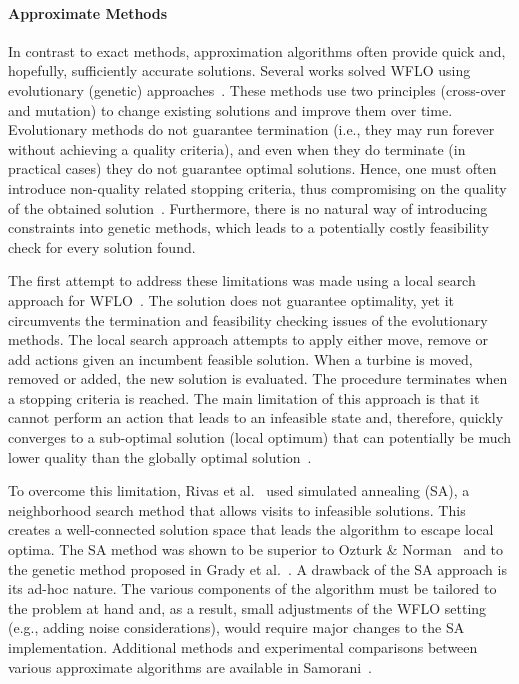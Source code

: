 \documentclass[preprint,12pt]{elsarticle}
\begin{document}
\paragraph{Approximate Methods} In contrast to exact methods, approximation algorithms often provide   
quick and, hopefully, sufficiently accurate solutions. Several works solved 
WFLO using evolutionary (genetic) approaches~\cite{MOSETTI1994105,gonzalez2010optimization,grady2005placement}. 
These methods use two principles (cross-over and mutation)
to change existing solutions and improve them over time. Evolutionary methods do not guarantee termination 
(i.e., they may run forever without achieving a quality criteria), and even when they do terminate (in practical cases) they do
not guarantee optimal solutions. Hence, one must often
introduce non-quality related stopping criteria, 
thus compromising on the quality of the obtained solution~\cite{davis1991handbook}.
Furthermore, there is no natural way of introducing constraints into genetic methods, which
leads to a potentially costly feasibility check for every solution found. 

The first attempt to address these limitations 
was made using a local search approach for WFLO~\cite{ozturk2004heuristic}. 
The solution does not guarantee optimality, 
yet it circumvents the termination and feasibility checking issues of the evolutionary
methods. The local search approach attempts to apply either move, remove or add actions given an incumbent 
feasible solution. When a turbine is moved, removed or added, the new solution is evaluated. The procedure terminates 
when a stopping criteria is reached.
The main limitation of this approach 
is that it cannot perform an action 
that leads to an infeasible state and, therefore, quickly converges to a sub-optimal solution (local optimum) 
that can potentially be much lower quality than the globally optimal solution~\cite{rivas2009solving}. 

To overcome this limitation, Rivas et al.\ \cite{rivas2009solving} used simulated annealing (SA), 
a neighborhood search method that allows visits to infeasible solutions. 
This creates a well-connected solution space that leads the algorithm to escape 
local optima. The SA method was shown to be superior to Ozturk \& Norman~\cite{ozturk2004heuristic} 
and to the genetic method proposed in Grady et al.\ \cite{grady2005placement}. A drawback of the SA approach 
is its ad-hoc nature. The various components of the algorithm
 must be tailored to the problem at hand and, as a result, small adjustments of the WFLO setting
 (e.g., adding noise considerations), would require major changes to the SA implementation. 
Additional methods and experimental comparisons between various approximate algorithms are available in Samorani~\cite{samorani2013wind}.
\end{document}

